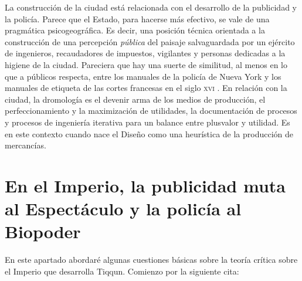 La construcción de la ciudad está relacionada con el desarrollo de la publicidad y la policía. Parece que el Estado, para hacerse más efectivo, se vale de una pragmática psicogeográfica. Es decir, una posición técnica orientada a la construcción de una percepción \emph{pública} del paisaje salvaguardada por un ejército de ingenieros, recaudadores de impuestos, vigilantes y personas dedicadas a la higiene de la ciudad. Pareciera que hay una suerte de similitud, al menos en lo que a públicos respecta, entre los manuales de la policía de Nueva York y los manuales de etiqueta de las cortes francesas en el siglo \textsc{xvi} \autocite{tiqqunIntroduccionGuerraCivil2008}. En relación con la ciudad, la dromología es el devenir arma de los medios de producción, el perfeccionamiento y la maximización de utilidades, la documentación de procesos y procesos de ingeniería iterativa para un balance entre plusvalor y utilidad. Es en este contexto cuando nace el Diseño como una heurística de la producción de mercancías.

\section{En el Imperio, la publicidad muta al Espectáculo y la policía al Biopoder}
\label{sec:en-el-imperio}

En este apartado abordaré algunas cuestiones básicas sobre la teoría crítica sobre el Imperio que desarrolla Tiqqun. Comienzo por la siguiente cita:

